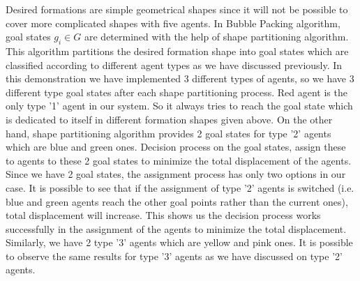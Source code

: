 Desired formations are simple geometrical shapes since it will not be possible to cover more complicated shapes with five agents. In Bubble Packing algorithm, goal states $g_i \in G$ are determined with the help of shape partitioning algorithm. This algorithm partitions the desired formation shape into goal states which are classified according to different agent types as we have discussed previously. In this demonstration we have implemented 3 different types of agents, so we have 3 different type goal states after each shape partitioning process. Red agent is the only type '1' agent in our system. So it always tries to reach the goal state which is dedicated to itself in different formation shapes given above. On the other hand, shape partitioning algorithm provides 2 goal states for type '2' agents which are blue and green ones. Decision process on the goal states, assign these to agents to these 2 goal states to minimize the total displacement of the agents. Since we have 2 goal states, the assignment process has only two options in our case. It is possible to see that if the assignment of type '2' agents is switched (i.e. blue and green agents reach the other goal points rather than the current ones), total displacement will increase. This shows us the decision process works successfully in the assignment of the agents to minimize the total displacement. Similarly, we have 2 type '3' agents which are yellow and pink ones. It is possible to observe the same results for type '3' agents as we have discussed on type '2' agents.
